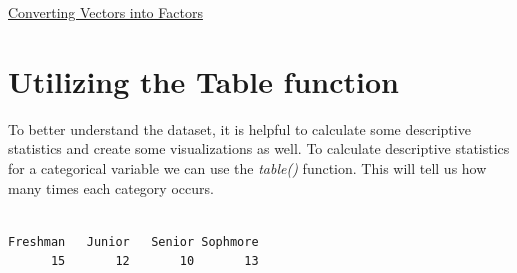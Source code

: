 \documentclass[
  letterpaper,
  DIV=11,
  numbers=noendperiod]{scrreprt}
\newenvironment{Shaded}{\begin{snugshade}}{\end{snugshade}}
\newcommand{\FunctionTok}[1]{\textcolor[rgb]{0.28,0.35,0.67}{#1}}
\newcommand{\NormalTok}[1]{\textcolor[rgb]{0.00,0.23,0.31}{#1}}
\newcommand{\OtherTok}[1]{\textcolor[rgb]{0.00,0.23,0.31}{#1}}
\newcommand{\SpecialCharTok}[1]{\textcolor[rgb]{0.37,0.37,0.37}{#1}}
\newcommand{\StringTok}[1]{\textcolor[rgb]{0.13,0.47,0.30}{#1}}
\begin{document}
\begin{Shaded}
\end{Shaded}

\begin{watch}{}{}
    \href{https://youtu.be/4oSEQDN8C1c}{Converting Vectors into Factors}
\end{watch}

\section{Utilizing the Table
function}\label{utilizing-the-table-function}

To better understand the dataset, it is helpful to calculate some
descriptive statistics and create some visualizations as well. To
calculate descriptive statistics for a categorical variable we can use
the \emph{table()} function. This will tell us how many times each
category occurs.

\begin{Shaded}
\end{Shaded}

\begin{verbatim}

Freshman   Junior   Senior Sophmore 
      15       12       10       13 
\end{verbatim}
\end{document}
